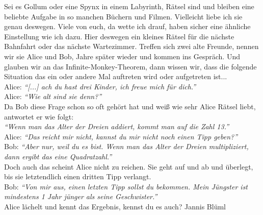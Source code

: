 {Sei es Gollum oder eine Spynx in einem Labyrinth, Rätsel sind und bleiben eine beliebte Aufgabe in so manchen Büchern und Filmen. Vielleicht liebe ich sie genau deswegen. Viele von euch, da wette ich drauf, haben sicher eine ähnliche Einstellung wie ich dazu. Hier deswegen ein kleines Rätsel für die nächste Bahnfahrt oder das nächste Wartezimmer.}
{
Treffen sich zwei alte Freunde, nennen wir sie Alice und Bob, Jahre später wieder und kommen ins Gespräch.
Und glauben wir an das Infinite-Monkey-Theorem, dann wissen wir, dass die folgende Situation das ein oder andere Mal auftreten wird oder aufgetreten ist... \\

Alice: \textit{\enquote{[...] ach du hast drei Kinder, ich freue mich für
dich.}} \\

Alice: \textit{\enquote{Wie alt sind sie denn?}} \\

Da Bob diese Frage schon so oft gehört hat und weiß wie sehr Alice Rätsel
liebt, antwortet er wie folgt: \\

\textit{\enquote{Wenn man das Alter der Dreien addiert, kommt man auf die Zahl
13.}} \\

Alice: \textit{\enquote{Das reicht mir nicht, kannst du mir nicht noch einen
Tipp geben?}} \\

Bob: \textit{\enquote{Aber nur, weil du es bist. Wenn man das Alter der Dreien
multipliziert, dann ergibt das eine Quadratzahl.}} \\

Doch auch das scheint Alice nicht zu reichen. Sie geht auf und ab und überlegt, bis sie letztendlich einen dritten Tipp verlangt. \\

Bob: \textit{\enquote{Von mir aus, einen letzten Tipp sollst du bekommen. Mein
Jüngster ist mindestens 1 Jahr jünger als seine Geschwister.}} \\

Alice lächelt und kennt das Ergebnis, kennst du es auch?
}{Jannis Blüml}
